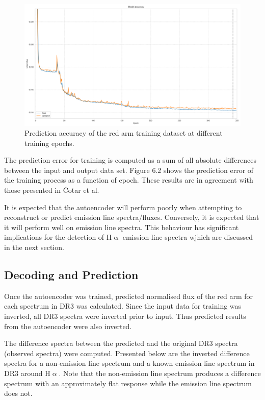 \begin{figure}[!htb]
\centering
\includegraphics[scale=0.38]{figures/ann_network_loss.png}
\caption{Prediction accuracy of the red arm training dataset at different training epochs.}
\end{figure}

The prediction error for training is computed as a sum of all absolute differences between the input and output data set. Figure 6.2 shows the prediction error of the training process as a function of epoch. These results are in agreement with those presented in Čotar et al.

It is expected that the autoencoder will perform poorly when attempting to reconstruct or predict emission line spectra/fluxes. Conversely, it is expected that it will perform well on emission line spectra. This behaviour has significant implications for the detection of H$\upalpha$ emission-line spectra wjhich are discussed in the next section.

\subsection{Decoding and Prediction}

Once the autoencoder was trained, predicted normalised flux of the red arm for each spectrum in DR3 was calculated. Since the input data for training was inverted, all DR3 spectra were inverted prior to input. Thus predicted results from the autoencoder were also inverted.

The difference spectra between the predicted and the original DR3 spectra (observed spectra) were computed. Presented below are the inverted difference spectra for a non-emission line spectrum and a known emission line spectrum in DR3 around H$\upalpha$. Note that the non-emission line spectrum produces a difference spectrum with an approximately flat response while the emission line spectrum does not. 

